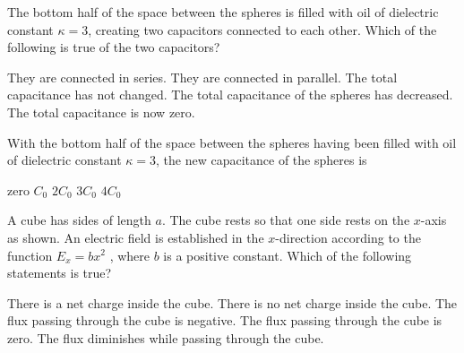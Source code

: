 \documentclass{../../oss-classkick-exam}
\begin{document}
\begin{multicols*}{2}
\begin{questions}
    \question The bottom half of the space between the spheres is filled with
    oil of dielectric constant $\kappa=3$, creating two capacitors connected to
    each other. Which of the following is true of the two capacitors?
    \begin{center}
    \end{center}
    \begin{choices}
      \choice They are connected in series.
      \choice They are connected in parallel.
      \choice The total capacitance has not changed.
      \choice The total capacitance of the spheres has decreased.
      \choice The total capacitance is now zero.
    \end{choices}
    \vspace{.7in}
    
    \question With the bottom half of the space between the spheres having been
    filled with oil of dielectric constant $\kappa=3$, the new capacitance of
    the spheres is
    \label{cap2}
    \begin{choices}
      \choice zero
      \choice $C_0$
      \choice $2C_0$
      \choice $3C_0$
      \choice $4C_0$
    \end{choices}
    \columnbreak

    \question A cube has sides of length $a$. The cube rests so that one side
    rests on the $x$-axis as shown. An electric field is established in the
    $x$-direction according to the function $E_x=bx^2$ , where $b$ is a positive
    constant. Which of the following statements is true?
    \label{cube1}
    \begin{choices}
      \choice There is a net charge inside the cube.
      \choice There is no net charge inside the cube.
      \choice The flux passing through the cube is negative.
      \choice The flux passing through the cube is zero.
      \choice The flux diminishes while passing through the cube.
    \end{choices}
    \vspace{.7in}
    

\end{questions}
\end{multicols*}
\end{document}
